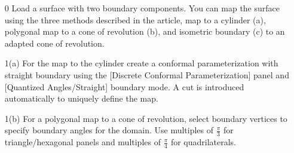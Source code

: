 \documentclass[Thesis.tex]{subfiles}
\begin{document}
\begin{itemize}
\item[0] Load a surface with two boundary components. You can map the surface using the three methods described in the article, map to a cylinder (a), polygonal map to a cone of revolution (b), and isometric boundary (c) to an adapted cone of revolution.
\item[1(a)] For the map to the cylinder create a conformal parameterization with straight boundary using the [Discrete Conformal Parameterization] panel and [Quantized Angles/Straight] boundary mode. A cut is introduced automatically to uniquely define the map.\\

\begin{center}
\begin{minipage}{0.9\linewidth}
            \centering
            \label{fig:periodic_algorithm1a}
\end{minipage}
\end{center}            

\item[1(b)] For a polygonal map to a cone of revolution, select boundary vertices to specify boundary angles for the domain. Use multiples of $\frac{\pi}{3}$ for triangle/hexagonal panels and multiples of $\frac{\pi}{4}$ for quadrilaterals.

\begin{center}
\begin{minipage}{0.9\linewidth}
            \centering
\end{minipage}
\end{center}


\end{itemize}
\end{document}
